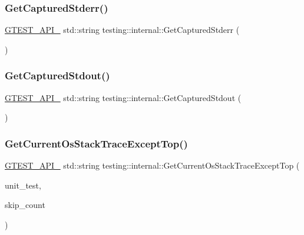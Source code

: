 \mbox{\label{namespacetesting_1_1internal_a374156401da17704099d0c33fa53adfb}} 
\subsubsection{\texorpdfstring{Get\+Captured\+Stderr()}{GetCapturedStderr()}}
{\footnotesize\ttfamily \hyperlink{gtest-port_8h_aa73be6f0ba4a7456180a94904ce17790}{G\+T\+E\+S\+T\+\_\+\+A\+P\+I\+\_\+} std\+::string testing\+::internal\+::\+Get\+Captured\+Stderr (\begin{DoxyParamCaption}{ }\end{DoxyParamCaption})}

\mbox{\label{namespacetesting_1_1internal_aed657219a9856a8d249a3230de0c54ce}} 
\subsubsection{\texorpdfstring{Get\+Captured\+Stdout()}{GetCapturedStdout()}}
{\footnotesize\ttfamily \hyperlink{gtest-port_8h_aa73be6f0ba4a7456180a94904ce17790}{G\+T\+E\+S\+T\+\_\+\+A\+P\+I\+\_\+} std\+::string testing\+::internal\+::\+Get\+Captured\+Stdout (\begin{DoxyParamCaption}{ }\end{DoxyParamCaption})}

\mbox{\label{namespacetesting_1_1internal_ae7ae495d3207e26968dfbd537c5e6dee}} 
\subsubsection{\texorpdfstring{Get\+Current\+Os\+Stack\+Trace\+Except\+Top()}{GetCurrentOsStackTraceExceptTop()}}
{\footnotesize\ttfamily \hyperlink{gtest-port_8h_aa73be6f0ba4a7456180a94904ce17790}{G\+T\+E\+S\+T\+\_\+\+A\+P\+I\+\_\+} std\+::string testing\+::internal\+::\+Get\+Current\+Os\+Stack\+Trace\+Except\+Top (\begin{DoxyParamCaption}\item[{\hyperlink{classtesting_1_1UnitTest}{Unit\+Test} $\ast$}]{unit\+\_\+test,  }\item[{int}]{skip\+\_\+count }\end{DoxyParamCaption})}

